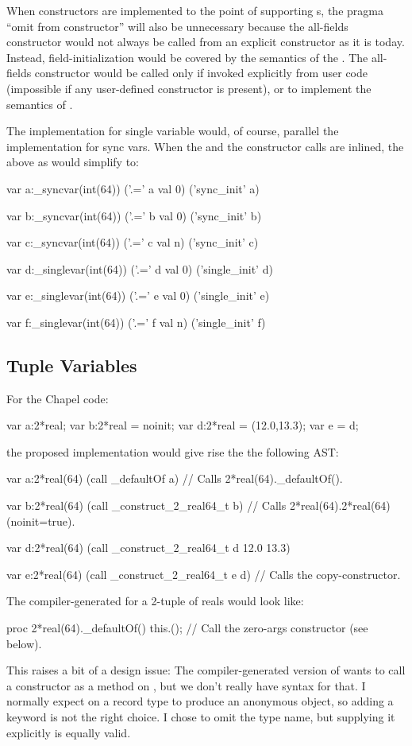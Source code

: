 When constructors are implemented to the point of supporting s,
the pragma ``omit from constructor'' will also be unnecessary because the all-fields
constructor would not always be called from an explicit constructor as it is today.
Instead, field-initialization would be covered by the semantics of the
.  The all-fields constructor would be called only if invoked
explicitly from user code (impossible if any user-defined constructor is present), or to
implement the semantics of .

The implementation for single variable would, of course, parallel the implementation for
sync vars.  When the  and the constructor calls are inlined, the above as would
simplify to:
\begin{numberedchapel}
  var a:_syncvar(int(64))
  ('.=' a val 0)
  ('sync_init' a)

  var b:_syncvar(int(64))
  ('.=' b val 0)
  ('sync_init' b)

  var c:_syncvar(int(64))
  ('.=' c val n)
  ('sync_init' c)

  var d:_singlevar(int(64))
  ('.=' d val 0)
  ('single_init' d)

  var e:_singlevar(int(64))
  ('.=' e val 0)
  ('single_init' e)

  var f:_singlevar(int(64))
  ('.=' f val n)
  ('single_init' f)
\end{numberedchapel}


\subsection{Tuple Variables}

For the Chapel code:
\begin{chapel}
  var a:2*real;
  var b:2*real = noinit;
  var d:2*real = (12.0,13.3);
  var e = d;
\end{chapel}
\noindent
the proposed implementation would give rise the the following AST:
\begin{numberedchapel}
  var a:2*real(64)
  (call _defaultOf a) // Calls 2*real(64)._defaultOf().

  var b:2*real(64)
  (call _construct_2_real64_t b) // Calls 2*real(64).2*real(64)(noinit=true).

  var d:2*real(64)
  (call _construct_2_real64_t d 12.0 13.3)

  var e:2*real(64)
  (call _construct_2_real64_t e d) // Calls the copy-constructor.
\end{numberedchapel}
The compiler-generated  for a 2-tuple of reals would look like:
\begin{chapel}
  proc 2*real(64)._defaultOf() {
    this.(); // Call the zero-args constructor (see below).
  }
\end{chapel}
\noindent
This raises a bit of a design issue: The compiler-generated version of 
wants to call a constructor as a method on , but we don't really have syntax
for that.  I normally expect  on a record type to produce an
anonymous object, so adding a  keyword is not the right choice.  I chose to
omit the type name, but supplying it explicitly is equally valid.  

